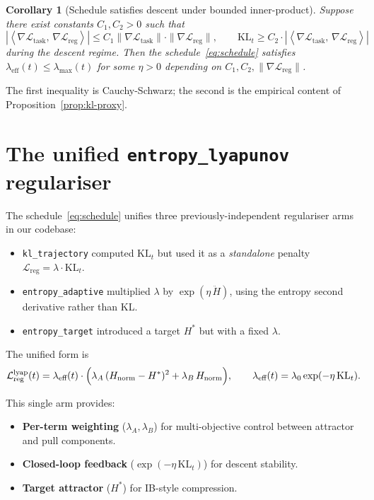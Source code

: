 \documentclass[11pt,a4paper]{article}
\newtheorem{corollary}{Corollary}
\newcommand{\inner}[2]{\left\langle #1,\, #2 \right\rangle}
\newcommand{\hnorm}{H_{\text{norm}}}
\newcommand{\Ltask}{\mathcal{L}_{\text{task}}}
\newcommand{\Lreg}{\mathcal{L}_{\text{reg}}}
\begin{document}
\begin{corollary}[Schedule satisfies descent under bounded inner-product]
\label{cor:safe-schedule}
Suppose there exist constants $C_1, C_2 > 0$ such that
\[
|\inner{\nabla\Ltask}{\nabla\Lreg}|
\leq C_1 \|\nabla\Ltask\| \cdot \|\nabla\Lreg\|,
\qquad
\mathrm{KL}_t \geq C_2 \cdot |\inner{\nabla\Ltask}{\nabla\Lreg}|
\]
during the descent regime. Then the schedule~\eqref{eq:schedule}
satisfies $\lambda_{\text{eff}}(t) \leq \lambda_{\max}(t)$ for some
$\eta > 0$ depending on $C_1, C_2, \|\nabla\Lreg\|$.
\end{corollary}

The first inequality is Cauchy-Schwarz; the second is the empirical
content of Proposition~\ref{prop:kl-proxy}.

\section{The unified \texttt{entropy\_lyapunov} regulariser}

The schedule~\eqref{eq:schedule} unifies three previously-independent
regulariser arms in our codebase:

\begin{itemize}
  \item \texttt{kl\_trajectory} computed $\mathrm{KL}_t$ but used it as
        a \emph{standalone} penalty
        $\Lreg = \lambda \cdot \mathrm{KL}_t$.
  \item \texttt{entropy\_adaptive} multiplied $\lambda$ by
        $\exp(\eta\, \ddot{H})$, using the entropy second derivative
        rather than KL.
  \item \texttt{entropy\_target} introduced a target $H^*$ but with a
        fixed $\lambda$.
\end{itemize}

The unified form is
\begin{equation}
\Lreg^{\text{lyap}}(t)
= \lambda_{\text{eff}}(t) \cdot
    \Bigl(
      \lambda_A\, (\hnorm - H^*)^2 + \lambda_B\, \hnorm
    \Bigr),
\qquad
\lambda_{\text{eff}}(t) = \lambda_0 \exp(-\eta\,\mathrm{KL}_t).
\label{eq:entropy-lyap}
\end{equation}

This single arm provides:
\begin{itemize}
  \item \textbf{Per-term weighting} ($\lambda_A, \lambda_B$) for
        multi-objective control between attractor and pull
        components.
  \item \textbf{Closed-loop feedback} ($\exp(-\eta\,\mathrm{KL}_t)$)
        for descent stability.
  \item \textbf{Target attractor} ($H^*$) for IB-style compression.
\end{itemize}
\end{document}
